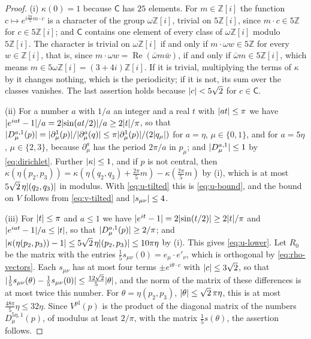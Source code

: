 \documentclass[11pt]{preprint}
\DeclarePairedDelimiter{\abs}{\lvert}{\rvert}
\numberwithin{equation}{section}
\theoremstyle{definition}
\theoremstyle{remark}
\theoremstyle{plain}
\begin{document}
\begin{proof}
(i) $\kappa(0) = 1$ because $\mathsf C$ has $25$ elements. For $m \in \mathbb Z[i]$ the function $c \mapsto e^{i\frac{2\pi}{5}m \cdot c}$ is a character of the group $\omega\mathbb Z[i]$, trivial on $5\mathbb Z[i]$, since $m \cdot c \in 5\mathbb Z$ for $c \in 5\mathbb Z[i]$; and $\mathsf C$ contains one element of every class of $\omega\mathbb Z[i]$ modulo $5\mathbb Z[i]$. The character is trivial on $\omega\mathbb Z[i]$ if and only if $m \cdot \omega w \in 5\mathbb Z$ for every $w \in \mathbb Z[i]$, that is, since $m \cdot \omega w = \operatorname{Re}(\bar\omega m\bar w)$, if and only if $\bar\omega m \in 5\mathbb Z[i]$, which means $m \in 5\omega\mathbb Z[i] = (3 + 4i)\mathbb Z[i]$. If it is trivial, multiplying the terms of $\kappa$ by it changes nothing, which is the periodicity; if it is not, its sum over the classes vanishes. The last assertion holds because $\abs{c} < 5\sqrt2$ for $c \in \mathsf C$.

(ii) For a number $a$ with $1/a$ an integer and a real $t$ with $\abs{at} \leq \pi$ we have $\abs{e^{iat} - 1}/a = 2\abs{\sin(at/2)}/a \geq 2\abs{t}/\pi$, so that $\abs{D^{a,1}_\mu(p)} = \abs{\partial^1_\mu(p)}/\abs{\partial^a_\mu(q)} \leq \pi\abs{\partial^1_\mu(p)}/(2\abs{q_\mu})$ for $a = \eta$, $\mu \in \{ 0, 1 \}$, and for $a = 5\eta$, $\mu \in \{ 2, 3 \}$, because $\partial^a_\mu$ has the period $2\pi/a$ in $p_\mu$; and $\abs{D^{a,1}_\mu} \leq 1$ by \eqref{eq:dirichlet}. Further $\abs\kappa \leq 1$, and if $p$ is not central, then $\kappa(\eta(p_2, p_3)) = \kappa(\eta(q_2, q_3) + \frac{2\pi}{5}m) - \kappa(\frac{2\pi}{5}m)$ by (i), which is at most $5\sqrt2\,\eta\abs{(q_2, q_3)}$ in modulus. With \eqref{eq:u-tilted} this is \eqref{eq:u-bound}, and the bound on $V$ follows from \eqref{eq:v-tilted} and $\abs{s_{\mu\nu}} \leq 4$.

(iii) For $\abs{t} \leq \pi$ and $a \leq 1$ we have $\abs{e^{it} - 1} = 2\abs{\sin(t/2)} \geq 2\abs{t}/\pi$ and $\abs{e^{iat} - 1}/a \leq \abs{t}$, so that $\abs{D^{a,1}_\mu(p)} \geq 2/\pi$; and $\abs{\kappa(\eta(p_2, p_3)) - 1} \leq 5\sqrt2\,\eta\abs{(p_2, p_3)} \leq 10\pi\eta$ by (i). This gives \eqref{eq:u-lower}. Let $R_0$ be the matrix with the entries $\frac15s_{\mu\nu}(0) = e_\mu \cdot e'_\nu$, which is orthogonal by \eqref{eq:rho-vectors}. Each $s_{\mu\nu}$ has at most four terms $\pm e^{i\theta \cdot c}$ with $\abs{c} \leq 3\sqrt2$, so that $\abs{\frac15s_{\mu\nu}(\theta) - \frac15s_{\mu\nu}(0)} \leq \frac{12\sqrt2}{5}\abs\theta$, and the norm of the matrix of these differences is at most twice this number. For $\theta = \eta(p_2, p_3)$, $\abs\theta \leq \sqrt2\,\pi\eta$, this is at most $\frac{48\pi}{5}\eta \leq 32\eta$. Since $V^{\mathrm{pl}}(p)$ is the product of the diagonal matrix of the numbers $D^{5\eta,1}_\mu(p)$, of modulus at least $2/\pi$, with the matrix $\frac15s(\theta)$, the assertion follows.
\end{proof}
\end{document}
